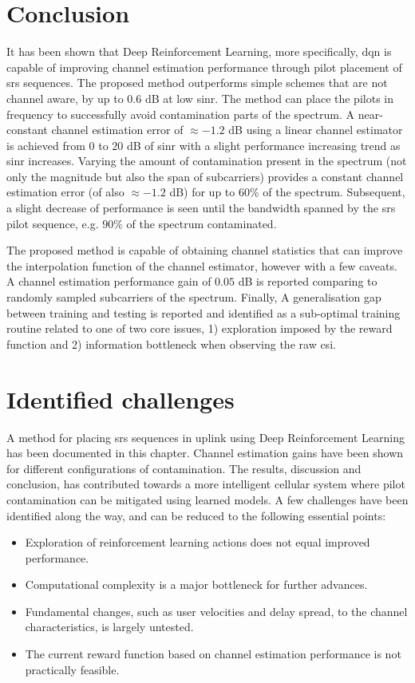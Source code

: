 \section{Conclusion}\label{sec:RL_conclusion}
It has been shown that Deep Reinforcement Learning, more specifically, \gls{dqn} is capable of improving channel estimation performance through pilot placement of \gls{srs} sequences. The proposed method outperforms simple schemes that are not channel aware, by up to $0.6$ dB at low \gls{sinr}. The method can place the pilots in frequency to successfully avoid contamination parts of the spectrum. A  near-constant channel estimation error of $\approx -1.2$ dB using a linear channel estimator is achieved from $0$ to $20$ dB of \gls{sinr} with a slight performance increasing trend as \gls{sinr} increases. Varying the amount of contamination present in the spectrum (not only the magnitude but also the span of subcarriers) provides a constant channel estimation error (of also $\approx -1.2$ dB) for up to $60\%$ of the spectrum. Subsequent, a slight decrease of performance is seen until the bandwidth spanned by the \gls{srs} pilot sequence, e.g. $90 \%$ of the spectrum contaminated. 

The proposed method is capable of obtaining channel statistics that can improve the interpolation function of the channel estimator, however with a few caveats. A channel estimation performance gain of $0.05$ dB is reported comparing to randomly sampled subcarriers of the spectrum. Finally, A generalisation gap between training and testing is reported and identified as a sub-optimal training routine related to one of two core issues, 1) exploration imposed by the reward function and 2) information bottleneck when observing the raw \gls{csi}.

\section{Identified challenges}\label{sec:RL_challenges}
A method for placing \gls{srs} sequences in uplink using Deep Reinforcement Learning has been documented in this chapter. Channel estimation gains have been shown for different configurations of contamination. The results, discussion and conclusion, has contributed towards a more intelligent cellular system where pilot contamination can be mitigated using learned models. A few challenges have been identified along the way, and can be reduced to the following essential points:

\begin{itemize}
    \item Exploration of reinforcement learning actions does not equal improved performance.
    \item Computational complexity is a major bottleneck for further advances.
    \item Fundamental changes, such as user velocities and delay spread, to the channel characteristics, is largely untested.
    \item The current reward function based on channel estimation performance is not practically feasible.
\end{itemize}



